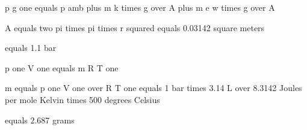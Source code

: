 p g one equals p amb plus m k times g over A plus m e w times g over A

A equals two pi times pi times r squared equals 0.03142 square meters

equals 1.1 bar

p one V one equals m R T one

m equals p one V one over R T one equals 1 bar times 3.14 L over 8.3142 Joules per mole Kelvin times 500 degrees Celsius

equals 2.687 grams
